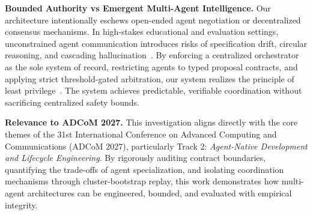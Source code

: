 \noindent\textbf{Bounded Authority vs Emergent Multi-Agent Intelligence.} Our architecture intentionally eschews open-ended agent negotiation or decentralized consensus mechanisms. In high-stakes educational and evaluation settings, unconstrained agent communication introduces risks of specification drift, circular reasoning, and cascading hallucination~\cite{mast}. By enforcing a centralized orchestrator as the sole system of record, restricting agents to typed proposal contracts, and applying strict threshold-gated arbitration, our system realizes the principle of least privilege~\cite{ss75}. The system achieves predictable, verifiable coordination without sacrificing centralized safety bounds.

\noindent\textbf{Relevance to ADCoM 2027.} This investigation aligns directly with the core themes of the 31st International Conference on Advanced Computing and Communications (ADCoM 2027), particularly Track 2: \emph{Agent-Native Development and Lifecycle Engineering}. By rigorously auditing contract boundaries, quantifying the trade-offs of agent specialization, and isolating coordination mechanisms through cluster-bootstrap replay, this work demonstrates how multi-agent architectures can be engineered, bounded, and evaluated with empirical integrity.
